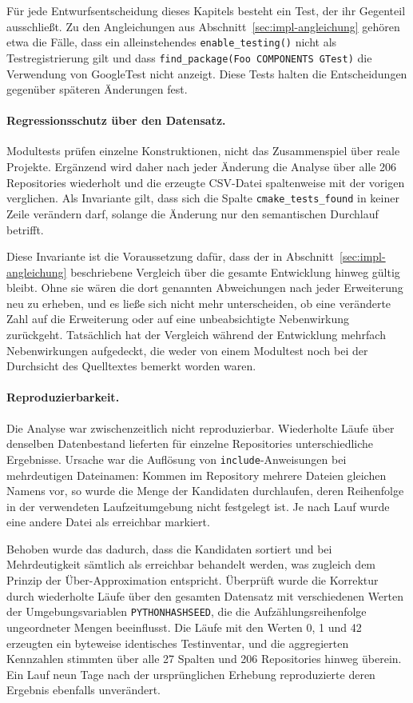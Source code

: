 \documentclass[12pt,a4paper,twoside,headsepline,parskip=half]{scrreprt}
\begin{document}
Für jede Entwurfsentscheidung dieses Kapitels besteht ein Test, der ihr Gegenteil
ausschließt. Zu den Angleichungen aus Abschnitt~\ref{sec:impl-angleichung} gehören
etwa die Fälle, dass ein alleinstehendes \texttt{enable\_testing()} nicht als
Testregistrierung gilt und dass \texttt{find\_package(Foo COMPONENTS GTest)} die
Verwendung von GoogleTest nicht anzeigt. Diese Tests halten die Entscheidungen
gegenüber späteren Änderungen fest.

\paragraph{Regressionsschutz über den Datensatz.}
Modultests prüfen einzelne Konstruktionen, nicht das Zusammenspiel über reale
Projekte. Ergänzend wird daher nach jeder Änderung die Analyse über alle 206
Repositories wiederholt und die erzeugte CSV-Datei spaltenweise mit der vorigen
verglichen. Als Invariante gilt, dass sich die Spalte \texttt{cmake\_tests\_found} in
keiner Zeile verändern darf, solange die Änderung nur den semantischen Durchlauf
betrifft.

Diese Invariante ist die Voraussetzung dafür, dass der in
Abschnitt~\ref{sec:impl-angleichung} beschriebene Vergleich über die gesamte
Entwicklung hinweg gültig bleibt. Ohne sie wären die dort genannten
Abweichungen nach jeder Erweiterung neu zu erheben, und es ließe sich nicht mehr
unterscheiden, ob eine veränderte Zahl auf die Erweiterung oder auf eine unbeabsichtigte
Nebenwirkung zurückgeht. Tatsächlich hat der Vergleich während der Entwicklung mehrfach
Nebenwirkungen aufgedeckt, die weder von einem Modultest noch bei der Durchsicht des
Quelltextes bemerkt worden waren.

\paragraph{Reproduzierbarkeit.}
Die Analyse war zwischenzeitlich nicht reproduzierbar. Wiederholte Läufe über
denselben Datenbestand lieferten für einzelne Repositories unterschiedliche Ergebnisse.
Ursache war die Auflösung von \texttt{include}-Anweisungen bei mehrdeutigen
Dateinamen: Kommen im Repository mehrere Dateien gleichen Namens vor, so wurde die
Menge der Kandidaten durchlaufen, deren Reihenfolge in der verwendeten
Laufzeitumgebung nicht festgelegt ist. Je nach Lauf wurde eine andere Datei als
erreichbar markiert.

Behoben wurde das dadurch, dass die Kandidaten sortiert und bei Mehrdeutigkeit
sämtlich als erreichbar behandelt werden, was zugleich dem Prinzip der
Über-Approximation entspricht. Überprüft wurde die Korrektur durch wiederholte Läufe
über den gesamten Datensatz mit verschiedenen Werten der Umgebungsvariablen
\texttt{PYTHONHASHSEED}, die die Aufzählungsreihenfolge ungeordneter Mengen
beeinflusst. Die Läufe mit den Werten 0, 1 und 42 erzeugten ein byteweise identisches
Testinventar, und die aggregierten Kennzahlen stimmten über alle 27 Spalten und 206
Repositories hinweg überein. Ein Lauf neun Tage nach der ursprünglichen Erhebung
reproduzierte deren Ergebnis ebenfalls unverändert.
\end{document}
